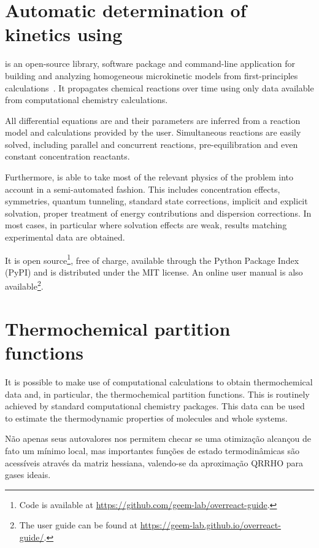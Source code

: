 \section{Automatic determination of kinetics using \overreact}%
\label{sec:overreact-methods}

\overreact{} is an open-source library, software package and command-line
application for building and analyzing
homogeneous microkinetic models from first-principles
calculations~\cite{Schneider2022,overreact2021zenodo}.
It propagates chemical reactions over time using only data available from
computational chemistry calculations.

All differential equations are and their parameters are inferred from a
reaction model and calculations provided by the user.
Simultaneous reactions are easily solved, including parallel and concurrent
reactions, pre-equilibration and even constant concentration reactants.

Furthermore, \overreact{} is able to take most of the relevant physics of the problem into
account in a semi-automated fashion.
This includes concentration effects, symmetries, quantum
tunneling, standard state corrections, implicit and explicit solvation, proper treatment
of energy contributions and dispersion corrections.
In most cases, in particular where solvation effects are weak, results matching
experimental data are obtained.

It is open source\footnote{Code is available at
	\url{https://github.com/geem-lab/overreact-guide}.}, free of charge, available through the Python Package Index (PyPI) and is
distributed under the MIT license.
An online user manual is also
available\footnote{The user guide can be found at \url{https://geem-lab.github.io/overreact-guide/}.}.

\section{Thermochemical partition functions}

It is possible to make use of computational calculations to obtain
thermochemical data and, in particular, the thermochemical partition
functions.
This is routinely achieved by standard computational chemistry packages.
This data can be used to estimate the thermodynamic properties of molecules and
whole systems.

Não apenas seus autovalores nos permitem checar se uma otimização alcançou de fato um mínimo local, mas importantes funções de estado termodinâmicas são acessíveis através da matriz hessiana, valendo-se da aproximação QRRHO para gases ideais.

